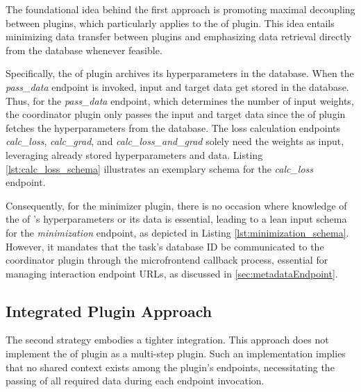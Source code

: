 \documentclass[
  a4paper,  %
  twoside,  %
  bibliography=totoc,
  headsepline,
  cleardoublepage=empty,
  parskip=half,
  draft=false
]{scrbook}
\begin{document}
The foundational idea behind the first approach is promoting maximal decoupling between plugins, which particularly applies to the \gls{of} plugin.
This idea entails minimizing data transfer between plugins and emphasizing data retrieval directly from the database whenever feasible.

Specifically, the \gls{of} plugin archives its hyperparameters in the database.
When the \emph{pass\_data} endpoint is invoked, input and target data get stored in the database.
Thus, for the \emph{pass\_data} endpoint, which determines the number of input weights, the coordinator plugin only passes the input and target data since the \gls{of} plugin fetches the hyperparameters from the database.
The loss calculation endpoints \emph{calc\_loss}, \emph{calc\_grad}, and \emph{calc\_loss\_and\_grad} solely need the weights as input, leveraging already stored hyperparameters and data.
Listing \ref{lst:calc_loss_schema} illustrates an exemplary schema for the \emph{calc\_loss} endpoint.

Consequently, for the minimizer plugin, there is no occasion where knowledge of the \gls{of} 's hyperparameters or its data is essential, leading to a lean input schema for the \emph{minimization} endpoint, as depicted in Listing \ref{lst:minimization_schema}.
However, it mandates that the task's database ID be communicated to the coordinator plugin through the microfrontend callback process, essential for managing interaction endpoint URLs, as discussed in \ref{sec:metadataEndpoint}.

\noindent\begin{minipage}{\linewidth}
  
\end{minipage}

\noindent\begin{minipage}{\linewidth}
  
\end{minipage}

\subsection{Integrated Plugin Approach}
\label{sec:secondApproach}

The second strategy embodies a tighter integration.
This approach does not implement the \gls{of} plugin as a multi-step plugin.
Such an implementation implies that no shared context exists among the plugin's endpoints, necessitating the passing of all required data during each endpoint invocation.
\end{document}
